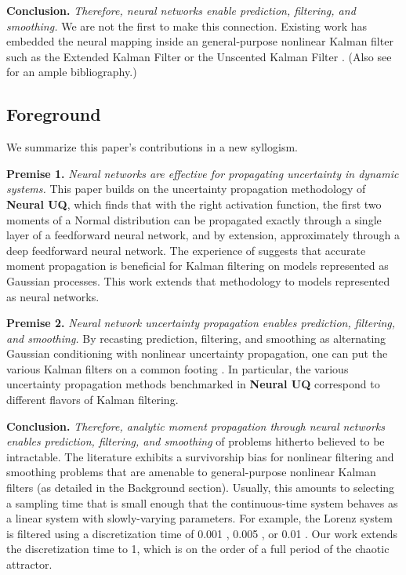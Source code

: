 \documentclass{article} %
\newcommand{\neuralUQ}{{\color{red} \textbf{Neural UQ}}\xspace}
\begin{document}
\textbf{Conclusion.} \emph{Therefore, neural networks enable prediction, filtering, and smoothing.}
We are not the first to make this connection.
Existing work has embedded the neural mapping inside an general-purpose nonlinear Kalman filter such as the Extended Kalman Filter \citep{oveissi_novel_2025} or the Unscented Kalman Filter \citep{anurag_rcukf_2025}.
(Also see \citet{bai_state_2023} for an ample bibliography.)

\subsection{Foreground}
We summarize this paper's contributions in a new syllogism.

\textbf{Premise 1.} \emph{Neural networks are effective for propagating uncertainty in dynamic systems.}
This paper builds on the uncertainty propagation methodology of \neuralUQ, which finds that with the right activation function, the first two moments of a Normal distribution can be propagated exactly through a single layer of a feedforward neural network, and by extension, approximately through a deep feedforward neural network.
The experience of \citet{deisenroth_analytic_2009} suggests that accurate moment propagation is beneficial for Kalman filtering on models represented as Gaussian processes.
This work extends that methodology to models represented as neural networks.

\textbf{Premise 2.} \emph{Neural network uncertainty propagation enables prediction, filtering, and smoothing.}
By recasting prediction, filtering, and smoothing as alternating Gaussian conditioning with nonlinear uncertainty propagation, one can put the various Kalman filters on a common footing \citep{sarkka_bayesian_2023,hennig_probabilistic_2022}.
In particular, the various uncertainty propagation methods benchmarked in \neuralUQ correspond to different flavors of Kalman filtering.

\textbf{Conclusion.} \emph{Therefore, analytic moment propagation through neural networks enables prediction, filtering, and smoothing} of problems hitherto believed to be intractable.
The literature exhibits a survivorship bias for nonlinear filtering and smoothing problems that are amenable to general-purpose nonlinear Kalman filters (as detailed in the Background section).
Usually, this amounts to selecting a sampling time that is small enough that the continuous-time system behaves as a linear system with slowly-varying parameters.
For example, the Lorenz system is filtered using a discretization time of 0.001 \citep{nosrati_chaotic_2011}, 0.005 \citep{dubois_data-driven_2020}, or 0.01 \cite{oveissi_novel_2025}.
Our work extends the discretization time to 1, which is on the order of a full period of the chaotic attractor.
\end{document}
